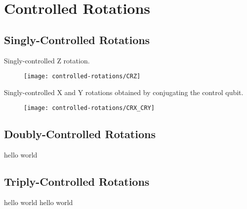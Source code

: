 \chapter{\label{controlled-rotations}Controlled Rotations}

\section{Singly-Controlled Rotations}
Singly-controlled Z rotation.

\begin{figure}[hb]
    \centering
    \texttt{[image: controlled-rotations/CRZ]}
\end{figure}

Singly-controlled X and Y rotations obtained by conjugating the control qubit.

\begin{figure}[hb]
    \centering
    \texttt{[image: controlled-rotations/CRX\_CRY]}
\end{figure}

\section{Doubly-Controlled Rotations}
hello world


\section{Triply-Controlled Rotations}
hello world
hello world
